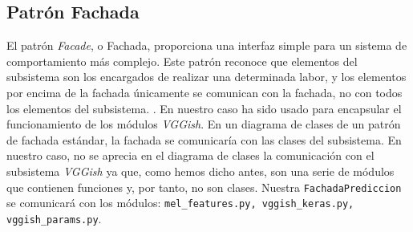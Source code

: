 \subsection{Patrón Fachada}
El patrón \textit{Facade}, o Fachada, proporciona una interfaz simple para un sistema de comportamiento más complejo. Este patrón reconoce que elementos del subsistema son los encargados de realizar una determinada labor, y los elementos por encima de la fachada únicamente se comunican con la fachada, no con todos los elementos del subsistema. \cite{wiki:fachada}. En nuestro caso ha sido usado para encapsular el funcionamiento de los módulos \textit{VGGish}. En un diagrama de clases de un patrón de fachada estándar, la fachada se comunicaría con las clases del subsistema. En nuestro caso, no se aprecia en el diagrama de clases la comunicación con el subsistema \textit{VGGish} ya que, como hemos dicho antes, son una serie de módulos que contienen funciones y, por tanto, no son clases. Nuestra \texttt{FachadaPrediccion} se comunicará con los módulos: \texttt{mel\_features.py, vggish\_keras.py, vggish\_params.py}.

